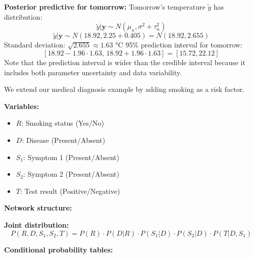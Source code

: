 \begin{examplebox}
\begin{example}
\textbf{Posterior predictive for tomorrow:}
Tomorrow's temperature $\tilde{y}$ has distribution:
$$\tilde{y}|\mathbf{y} \sim N(\mu_n, \sigma^2 + \tau_n^2)$$
$$\tilde{y}|\mathbf{y} \sim N(18.92, 2.25 + 0.405) = N(18.92, 2.655)$$
Standard deviation: $\sqrt{2.655} \approx 1.63$ °C
95\% prediction interval for tomorrow:
$$[18.92 - 1.96 \cdot 1.63, \, 18.92 + 1.96 \cdot 1.63] = [15.72, 22.12]$$
Note that the prediction interval is wider than the credible interval because it includes both parameter uncertainty and data variability.
\end{example}
\end{examplebox}

\begin{examplebox}
\begin{example}
We extend our medical diagnosis example by adding smoking as a risk factor.

\textbf{Variables:}
\begin{itemize}
\item $R$: Smoking status (Yes/No)
\item $D$: Disease (Present/Absent)
\item $S_1$: Symptom 1 (Present/Absent)
\item $S_2$: Symptom 2 (Present/Absent)
\item $T$: Test result (Positive/Negative)
\end{itemize}

\textbf{Network structure:}
\begin{center}
\end{center}

\textbf{Joint distribution:}
$$P(R, D, S_1, S_2, T) = P(R) \cdot P(D|R) \cdot P(S_1|D) \cdot P(S_2|D) \cdot P(T|D, S_1)$$

\textbf{Conditional probability tables:}


\end{example}
\end{examplebox}
